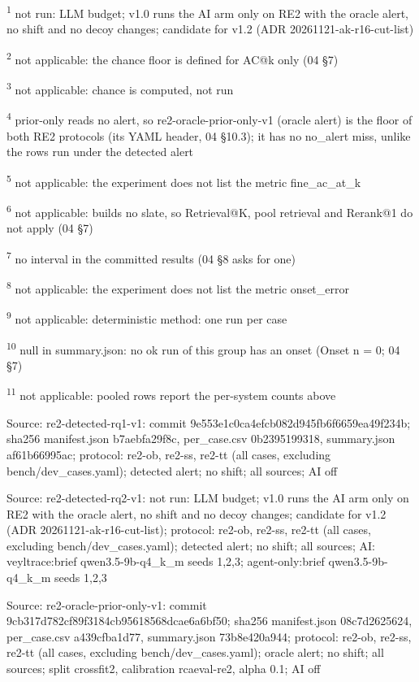 \par\raggedright\noindent
\textsuperscript{1} not run: LLM budget; v1.0 runs the AI arm only on RE2 with the oracle alert, no shift and no decoy changes; candidate for v1.2 (ADR 20261121-ak-r16-cut-list)\par
\textsuperscript{2} not applicable: the chance floor is defined for AC@k only (04 \S{}7)\par
\textsuperscript{3} not applicable: chance is computed, not run\par
\textsuperscript{4} prior-only reads no alert, so re2-oracle-prior-only-v1 (oracle alert) is the floor of both RE2 protocols (its YAML header, 04 \S{}10.3); it has no no\_alert miss, unlike the rows run under the detected alert\par
\textsuperscript{5} not applicable: the experiment does not list the metric fine\_ac\_at\_k\par
\textsuperscript{6} not applicable: builds no slate, so Retrieval@K, pool retrieval and Rerank@1 do not apply (04 \S{}7)\par
\textsuperscript{7} no interval in the committed results (04 \S{}8 asks for one)\par
\textsuperscript{8} not applicable: the experiment does not list the metric onset\_error\par
\textsuperscript{9} not applicable: deterministic method: one run per case\par
\textsuperscript{10} null in summary.json: no ok run of this group has an onset (Onset n = 0; 04 \S{}7)\par
\textsuperscript{11} not applicable: pooled rows report the per-system counts above\par
\noindent Source: re2-detected-rq1-v1: commit 9e553e1c0ca4efcb082d945fb6f6659ea49f234b; sha256 manifest.json b7aebfa29f8c, per\_case.csv 0b2395199318, summary.json af61b66995ac; protocol: re2-ob, re2-ss, re2-tt (all cases, excluding bench/\allowbreak{}dev\_cases.yaml); detected alert; no shift; all sources; AI off\par
\noindent Source: re2-detected-rq2-v1: not run: LLM budget; v1.0 runs the AI arm only on RE2 with the oracle alert, no shift and no decoy changes; candidate for v1.2 (ADR 20261121-ak-r16-cut-list); protocol: re2-ob, re2-ss, re2-tt (all cases, excluding bench/\allowbreak{}dev\_cases.yaml); detected alert; no shift; all sources; AI: veyltrace:brief qwen3.5-9b-q4\_k\_m seeds 1,2,3; agent-only:brief qwen3.5-9b-q4\_k\_m seeds 1,2,3\par
\noindent Source: re2-oracle-prior-only-v1: commit 9cb317d782cf89f3184cb95618568dcae6a6bf50; sha256 manifest.json 08c7d2625624, per\_case.csv a439cfba1d77, summary.json 73b8e420a944; protocol: re2-ob, re2-ss, re2-tt (all cases, excluding bench/\allowbreak{}dev\_cases.yaml); oracle alert; no shift; all sources; split crossfit2, calibration rcaeval-re2, alpha 0.1; AI off\par
